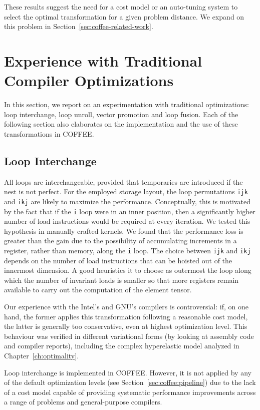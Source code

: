 These results suggest the need for a cost model or an auto-tuning system to select the optimal transformation for a given problem distance. We expand on this problem in Section~\ref{sec:coffee-related-work}.

\section{Experience with Traditional Compiler Optimizations}
\label{sec:coffee-genpurp-opts}
In this section, we report on an experimentation with traditional optimizations: loop interchange, loop unroll, vector promotion and loop fusion. Each of the following section also elaborates on the implementation and the use of these transformations in COFFEE. 

\subsection{Loop Interchange}
\label{sec:coffee-genpurp-opts-interchange}
All loops are interchangeable, provided that temporaries are introduced if the nest is not perfect. For the employed storage layout, the loop permutations \texttt{ijk} and \texttt{ikj} are likely to maximize the performance. Conceptually, this is motivated by the fact that if the \texttt{i} loop were in an inner position, then a significantly higher number of load instructions would be required at every iteration. We tested this hypothesis in manually crafted kernels. We found that the performance loss is greater than the gain due to the possibility of accumulating increments in a register, rather than memory, along the \texttt{i} loop. The choice between \texttt{ijk} and \texttt{ikj} depends on the number of load instructions that can be hoisted out of the innermost dimension. A good heuristics it to choose as outermost the loop along which the number of invariant loads is smaller so that more registers remain available to carry out the computation of the element tensor. 

Our experience with the Intel's and GNU's compilers is controversial: if, on one hand, the former applies this transformation following a reasonable cost model, the latter is generally too conservative, even at highest optimization level. This behaviour was verified in different variational forms (by looking at assembly code and compiler reports), including the complex hyperelastic model analyzed in Chapter~\ref{ch:optimality}. 

Loop interchange is implemented in COFFEE. However, it is not applied by any of the default optimization levels (see Section~\ref{sec:coffee:pipeline}) due to the lack of a cost model capable of providing systematic performance improvements across a range of problems and general-purpose compilers.  

